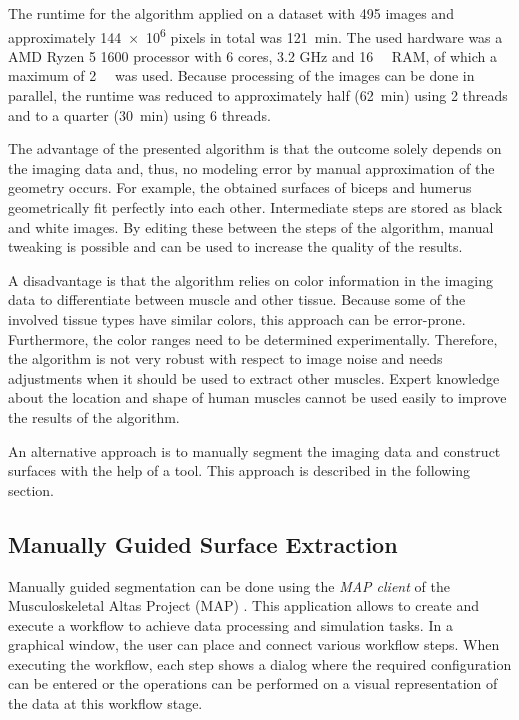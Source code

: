The runtime for the algorithm applied on a dataset with \num{495} images and approximately \num{144e6} pixels in total was \SI{121}{\minute}. The used hardware was a AMD Ryzen 5 1600 processor with 6 cores, 3.2 GHz and \SI{16}{\giga\byte} RAM, of which a maximum of \SI{2}{\giga\byte} was used. Because processing of the images can be done in parallel, the runtime was reduced to approximately half (\SI{62}{\minute}) using 2 threads and to a quarter (\SI{30}{\minute}) using 6 threads.

The advantage of the presented algorithm is that the outcome solely depends on the imaging data and, thus, no modeling error by manual approximation of the geometry occurs. For example, the obtained surfaces of biceps and humerus geometrically fit perfectly into each other. Intermediate steps are stored as black and white images. By editing these between the steps of the algorithm, manual tweaking is possible and can be used to increase the quality of the results.

A disadvantage is that the algorithm relies on color information in the imaging data to differentiate between muscle and other tissue. Because some of the involved tissue types have similar colors, this approach can be error-prone. Furthermore, the color ranges need to be determined experimentally. Therefore, the algorithm is not very robust with respect to image noise and needs adjustments when it should be used to extract other muscles. Expert knowledge about the location and shape of human muscles cannot be used easily to improve the results of the algorithm.

An alternative approach is to manually segment the imaging data and construct surfaces with the help of a tool. This approach is described in the following section.

\subsection{Manually Guided Surface Extraction}\label{sec:surf_extr}

Manually guided segmentation can be done using the \emph{MAP client} of the Musculoskeletal Altas Project (MAP) \cite{mapclient}. This application allows to create and execute a workflow to achieve data processing and simulation tasks. In a graphical window, the user can place and connect various workflow steps. When executing the workflow, each step shows a dialog where the required configuration can be entered or the operations can be performed on a visual representation of the data at this workflow stage. 

